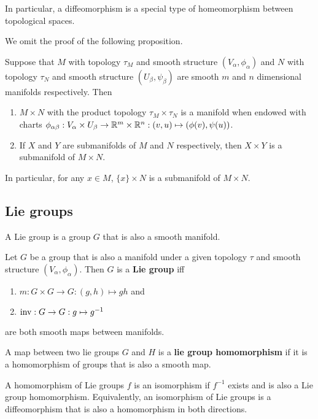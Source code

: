 \documentclass[a4paper]{article}
\begin{document}
In particular, a diffeomorphism is a special type of homeomorphism between topological spaces.

We omit the proof of the following proposition.

\begin{prop}
    Suppose that $M$ with topology $\tau_M$ and smooth structure $(V_\alpha, \phi_\alpha)$ and $N$ with topology $\tau_N$ and smooth structure $(U_\beta, \psi_\beta)$ are smooth $m$ and $n$ dimensional manifolds respectively. Then 
    \begin{enumerate}
        \item $M \times N$ with the product topology $\tau_M \times \tau_N$ is a manifold when endowed with charts $\phi_{\alpha\beta}: V_\alpha \times U_\beta \to \mathbb{R}^m \times \mathbb{R}^n: (v, u) \mapsto (\phi(v), \psi(u))$.
        \item If $X$ and $Y$ are submanifolds of $M$ and $N$ respectively, then $X \times Y$ is a submanifold of $M \times N$.
    \end{enumerate}
    In particular, for any $x \in M$, $\{x\} \times N$ is a submanifold of $M \times N$.
\end{prop}

\subsection{Lie groups}

A Lie group is a group $G$ that is also a smooth manifold. 

\begin{defi}
    Let $G$ be a group that is also a manifold under a given topology $\tau$ and smooth structure $(V_\alpha, \phi_\alpha)$. Then $G$ is a \textbf{Lie group} iff 
    \begin{enumerate}
        \item $m: G \times G \to G : (g, h) \mapsto gh$ and
        \item $\operatorname{inv}: G \to G : g \mapsto g^{-1}$ 
    \end{enumerate}
    are both smooth maps between manifolds.
\end{defi}

\begin{defi}
    A map between two lie groups $G$ and $H$ is a \textbf{lie group homomorphism} if it is a homomorphism of groups that is also a smooth map.
\end{defi}

A homomorphism of Lie groups $f$ is an isomorphism if $f^{-1}$ exists and is also a Lie group homomorphism. Equivalently, an isomorphism of Lie groups is a diffeomorphism that is also a homomorphism in both directions.
\end{document}
